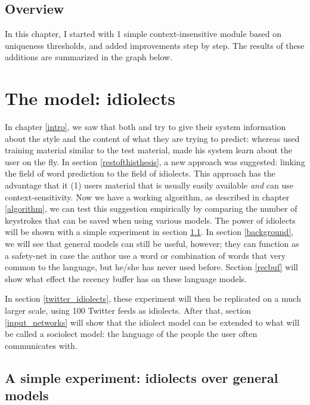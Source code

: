 \documentclass[12pt]{article}
\let\stdsection\section
\renewcommand\section{\newpage\stdsection}
\begin{document}
\subsection{Overview}
In this chapter, I started with 1 simple context-insensitive module based on uniqueness thresholds, and added improvements step by step. The results of these additions are summarized in the graph below.








\section{The model: idiolects} \label{model}

In chapter \ref{intro}, we saw that both  and  try to give their system information about the style and the content of what they are trying to predict: whereas  used training material similar to the test material,  made his system learn about the user on the fly. In section \ref{restofthisthesis}, a new approach was suggested: linking the field of word prediction to the field of idiolects. This approach has the advantage that it (1) users material that is usually easily available \emph{and} can use context-sensitivity. Now we have a working algorithm, as described in chapter \ref{algorithm}, we can test this suggestion empirically by comparing the number of keystrokes that can be saved when using various models. The power of idiolects will be shown with a simple experiment in section \ref{simple_exp}. In section \ref{background}, we will see that general models can still be useful, however; they can function as a safety-net in case the author use a word or combination of words that very common to the language, but he/she has never used before. Section \ref{recbuf} will show what effect the recency buffer has on these language models.

In section \ref{twitter_idiolects}, these experiment will then be replicated on a much larger scale, using 100 Twitter feeds as idiolects. After that, section \ref{input_networks} will show that the idiolect model can be extended to what will be called a sociolect model: the language of the people the user often communicates with.

\subsection{A simple experiment: idiolects over general models} \label{simple_exp}
\end{document}
